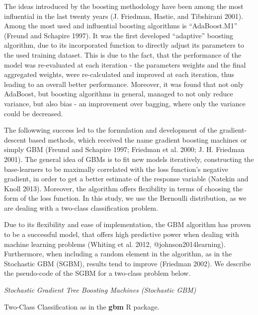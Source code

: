 \documentclass[12pt,]{article}
\begin{document}
The ideas introduced by the boosting methodology have been among the
most influential in the last twenty years (J. Friedman, Hastie, and
Tibshirani 2001). Among the most used and influential boosting
algorithms is ``AdaBoost.M1'' (Freund and Schapire 1997). It was the
first developed ``adaptive'' boosting algorithm, due to its incorporated
function to directly adjust its parameters to the used training dataset.
This is due to the fact, that the performance of the model was
re-evaluated at each iteration - the parameters weights and the final
aggregated weights, were re-calculated and improved at each iteration,
thus leading to an overall better performance. Moreover, it was found
that not only AdaBoost, but boosting algorithms in general, managed to
not only reduce variance, but also bias - an improvement over bagging,
where only the variance could be decreased.

The followwing success led to the formulation and development of the
gradient-descent based methods, which received the name gradient
boosting machines or simply GBM (Freund and Schapire 1997; Friedman et
al. 2000; J. H. Friedman 2001). The general idea of GBMs is to fit new
models iteratively, constructing the base-learners to be maximally
correlated with the loss function's negative gradient, in order to get a
better estimate of the response variable (Natekin and Knoll 2013).
Moreover, the algorithm offers flexibility in terms of choosing the form
of the loss function. In this study, we use the Bernoulli distribution,
as we are dealing with a two-class classification problem.

Due to its flexibility and ease of implementation, the GBM algorithm has
proven to be a successful model, that offers high predictive power when
dealing with machine learning problems (Whiting et al. 2012,
@johnson2014learning). Furthermore, when including a random element in
the algorithm, as in the Stochastic GBM (SGBM), results tend to improve
(Friedman 2002). We describe the pseudo-code of the SGBM for a two-class
problem below.

\emph{Stochastic Gradient Tree Boosting Machines (Stochastic GBM)}

Two-Class Classification as in the \textbf{gbm} R package.
\end{document}
